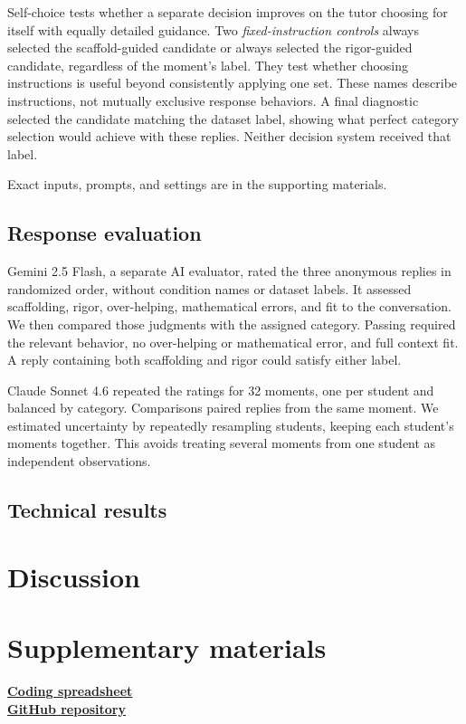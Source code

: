 \documentclass[10pt,a4paper]{article}
\begin{document}
Self-choice tests whether a separate decision improves on the tutor choosing for itself with equally detailed guidance. Two \emph{fixed-instruction controls} always selected the scaffold-guided candidate or always selected the rigor-guided candidate, regardless of the moment's label. They test whether choosing instructions is useful beyond consistently applying one set. These names describe instructions, not mutually exclusive response behaviors. A final diagnostic selected the candidate matching the dataset label, showing what perfect category selection would achieve with these replies. Neither decision system received that label.

Exact inputs, prompts, and settings are in the supporting materials.

\subsection{Response evaluation}
Gemini 2.5 Flash, a separate AI evaluator, rated the three anonymous replies in randomized order, without condition names or dataset labels. It assessed scaffolding, rigor, over-helping, mathematical errors, and fit to the conversation. We then compared those judgments with the assigned category. Passing required the relevant behavior, no over-helping or mathematical error, and full context fit. A reply containing both scaffolding and rigor could satisfy either label.

Claude Sonnet 4.6 repeated the ratings for 32 moments, one per student and balanced by category. Comparisons paired replies from the same moment. We estimated uncertainty by repeatedly resampling students, keeping each student's moments together. This avoids treating several moments from one student as independent observations.

\subsection{Technical results}


\section{Discussion}


\clearpage
\printbibliography[heading=bibliography,title={References}]

\section{Supplementary materials}
\noindent\href{https://docs.google.com/spreadsheets/d/1c1M8iS5TUapMh4C96j5OOcxBn6TDH_WA3Cdb7I6UnyA/edit}{\textcolor{supplementblue}{\underline{\textbf{Coding spreadsheet}}}}\\[3pt]
\href{https://github.com/shayanahmad7/tutormoments-decision-router}{\textcolor{supplementblue}{\underline{\textbf{GitHub repository}}}}
\end{document}
